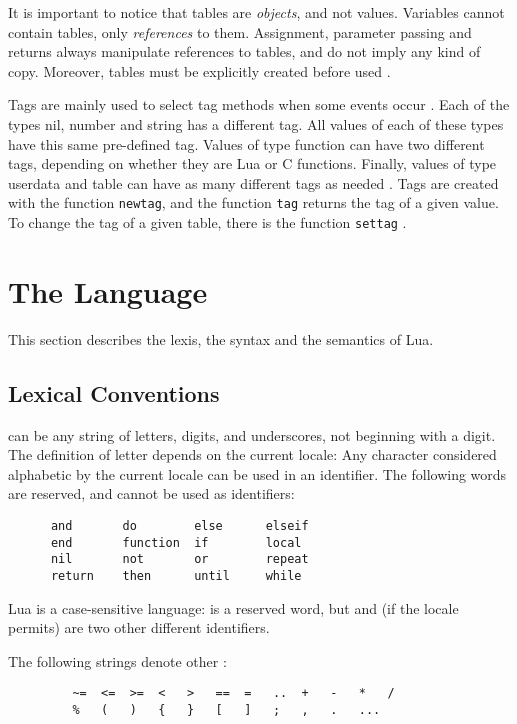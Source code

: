 It is important to notice that tables are \emph{objects}, and not values.
Variables cannot contain tables, only \emph{references} to them.
Assignment, parameter passing and returns always manipulate references
to tables, and do not imply any kind of copy.
Moreover, tables must be explicitly created before used
.

Tags are mainly used to select tag methods when
some events occur .
Each of the types nil, number and string has a different tag.
All values of each of these types have this same pre-defined tag.
Values of type function can have two different tags,
depending on whether they are Lua or C functions.
Finally,
values of type userdata and table can have
as many different tags as needed .
Tags are created with the function \verb|newtag|,
and the function \verb|tag| returns the tag of a given value.
To change the tag of a given table,
there is the function \verb|settag| .


\section{The Language}

This section describes the lexis, the syntax and the semantics of Lua.


\subsection{Lexical Conventions} \label{lexical}

 can be any string of letters, digits, and underscores,
not beginning with a digit.
The definition of letter depends on the current locale:
Any character considered alphabetic by the current locale
can be used in an identifier.
The following words are reserved, and cannot be used as identifiers:
\begin{verbatim}
      and       do        else      elseif
      end       function  if        local
      nil       not       or        repeat
      return    then      until     while
\end{verbatim}
Lua is a case-sensitive language:
 is a reserved word, but  and 
(if the locale permits) are two other different identifiers.

The following strings denote other :
\begin{verbatim}
         ~=  <=  >=  <   >   ==  =   ..  +   -   *   /
         %   (   )   {   }   [   ]   ;   ,   .   ...
\end{verbatim}

